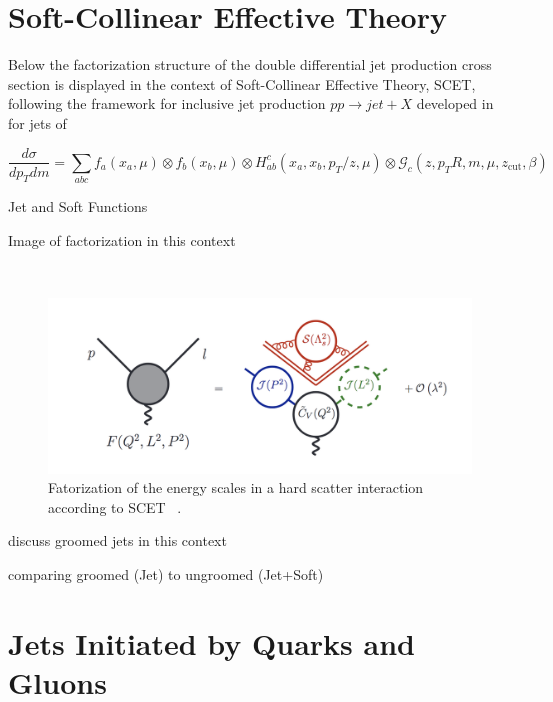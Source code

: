 

\section{Soft-Collinear Effective Theory}\label{sec:SCET}


Below the factorization structure of the double differential jet production cross section is displayed in the context of Soft-Collinear Effective Theory, SCET, following the framework for inclusive jet production $pp \rightarrow jet + X$ developed in for jets of  %

\begin{equation}
\frac{d \sigma}{ d p_{T} d m}=\sum_{a b c} f_{a}\left(x_{a}, \mu\right) \otimes f_{b}\left(x_{b}, \mu\right) \otimes H_{a b}^{c}\left(x_{a}, x_{b}, p_{T} / z, \mu\right) \otimes \mathcal{G}_{c}\left(z, p_{T} R, m, \mu, z_{\mathrm{cut}}, \beta\right)
\end{equation}

Jet and Soft Functions 


Image of factorization in this context

~\cite{Becher:2014oda}
\begin{figure}[htb]
\centering
\includegraphics[width=1.0\textwidth]{visuals/SCET-factorization.png}
\caption{Fatorization of the energy scales in a hard scatter interaction according to SCET ~\cite{Becher:2014oda}.}
\label{fig:scet}
\end{figure}
discuss groomed jets in this context

comparing groomed  (Jet) to ungroomed (Jet+Soft)



\section{Jets Initiated by Quarks and Gluons }\label{sec:quarkandgluonjets}



